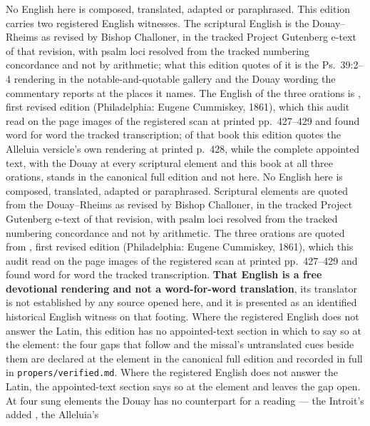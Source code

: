 \ifdefined\TriptychSynthesisEdition
No English here is composed, translated, adapted or paraphrased. This edition
carries two registered English witnesses. The scriptural English is the
Douay--Rheims as revised by Bishop Challoner, in the tracked Project Gutenberg
e-text of that revision, with psalm loci resolved from the tracked numbering
concordance and not by arithmetic; what this edition quotes of it is the
Ps.\ 39:2--4 rendering in the notable-and-quotable gallery and the Douay
wording the commentary reports at the places it names. The English of the three
orations is , first revised edition (Philadelphia: Eugene Cummiskey, 1861),
which this audit read on the page images of the registered scan at printed
pp.~427--429 and found word for word the tracked transcription; of that book
this edition quotes the Alleluia versicle's own rendering at printed p.~428,
while the complete appointed text, with the Douay at every scriptural element
and this book at all three orations, stands in the canonical full edition and
not here.%
\else
No English here is composed, translated, adapted or paraphrased. Scriptural
elements are quoted from the Douay--Rheims as revised by Bishop Challoner, in the
tracked Project Gutenberg e-text of that revision, with psalm loci resolved from
the tracked numbering concordance and not by arithmetic. The three orations are
quoted from , first revised edition (Philadelphia: Eugene Cummiskey, 1861),
which this audit read on the page images of the registered scan at printed
pp.~427--429 and found word for word the tracked transcription.%
\fi{} \textbf{That
English is a free devotional rendering and not a word-for-word translation}, its
translator is not established by any source opened here, and it is presented as an
identified historical English witness on that footing.
\ifdefined\TriptychSynthesisEdition
Where the registered English does not answer the Latin, this edition has no
appointed-text section in which to say so at the element: the four gaps that
follow and the missal's untranslated cues beside them are declared at the
element in the canonical full edition and recorded in full in
\texttt{propers/verified.md}.%
\else
Where the registered
English does not answer the Latin, the appointed-text section says so at the
element and leaves the gap open.%
\fi{} At four sung elements the Douay has no
counterpart for a reading --- the Introit's added , the Alleluia's
